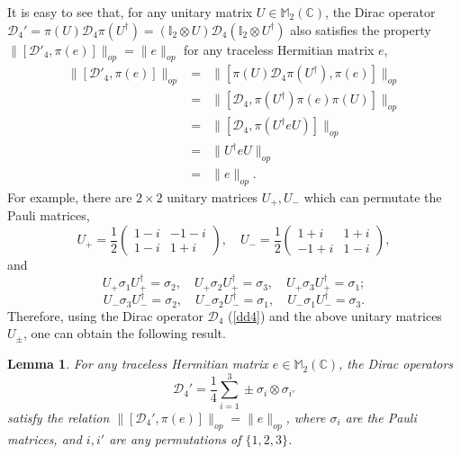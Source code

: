 \documentclass[a4paper,12pt]{article}
\newtheorem{lemma}{Lemma}
\begin{document}
It is easy to see that, for any unitary matrix $U \in \mathbb{M}_2
(\mathbb{C})$, the Dirac operator $\mathcal{D}_4' = \pi (U) \mathcal{D}_4 \pi
(U^{\dag}) = (\mathbb{I}_2 \otimes U) \mathcal{D}_4  (\mathbb{I}_2 \otimes
U^{\dag})$ also satisfies the property $\|[\mathcal{D}'_4, \pi (e)]\|_{op} =
\|e\|_{op}$ for any traceless Hermitian matrix $e$,
\begin{eqnarray}
  \|[\mathcal{D}'_4, \pi (e)]\|_{op} & = & \|[\pi (U)\mathcal{D}_4 \pi
  (U^{\dag}), \pi (e)]\|_{op}\nonumber\\
  & = & \|[\mathcal{D}_4, \pi (U^{\dag}) \pi (e) \pi (U)]\|_{op}\nonumber\\
  & = & \|[\mathcal{D}_4, \pi (U^{\dag} e U)]\|_{op}\nonumber\\
  & = & \|U^{\dag} e U\|_{op}\nonumber\\
  & = & \|e\|_{op} .
\end{eqnarray}
For example, there are $2 \times 2$ unitary matrices $U_+, U_-$ which can
permutate the Pauli matrices,
\begin{equation}
  U_+ = \frac{1}{2} \left( \begin{array}{cc}
    1 - i & - 1 - i\\
    1 - i & 1 + i
  \end{array} \right), \quad U_- = \frac{1}{2} \left( \begin{array}{cc}
    1 + i & 1 + i\\
    - 1 + i & 1 - i
  \end{array} \right),
\end{equation}
and
\begin{equation}
  U_+ \sigma_1 U_+^{\dag} = \sigma_2, \quad U_+ \sigma_2 U_+^{\dag} =
  \sigma_3, \quad U_+ \sigma_3 U_+^{\dag} = \sigma_1 ;
\end{equation}
\begin{equation}
  U_- \sigma_3 U_-^{\dag} = \sigma_2, \quad U_- \sigma_2 U_-^{\dag} =
  \sigma_1, \quad U_- \sigma_1 U_-^{\dag} = \sigma_3 .
\end{equation}
Therefore, using the Dirac operator $\mathcal{D}_4$ (\ref{dd4}) and the above unitary matrices $U_{\pm}$, one can obtain the following result.
\begin{lemma}
  For any traceless Hermitian matrix $e \in \mathbb{M}_2 (\mathbb{C})$, the
  Dirac operators
  \begin{equation}\label{d4p}
    \mathcal{D}_4' = \frac{1}{4}  \sum_{i = 1}^3 \pm \sigma_i \otimes
    \sigma_{i'}
  \end{equation}
  satisfy the relation $\|[\mathcal{D}_4', \pi (e)]\|_{op} = \|e\|_{op}$,
  where $\sigma_i$ are the Pauli matrices, and $i, i'$ are any permutations of
  $\{1, 2, 3\}$.
\end{lemma}
\end{document}
